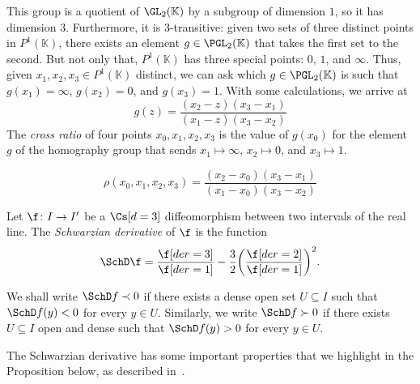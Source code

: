 \documentclass[../main]{subfiles}
\begin{document}
This group is a quotient of \(\GL_2(\mathbb{K})\) by a subgroup of dimension \(1\), so it has dimension \(3\). Furthermore, it is \(3\)-transitive: given two sets of three distinct points in \(P^1(\mathbb{K})\), there exists an element \(g \in \PGL_2(\mathbb{K})\) that takes the first set to the second. But not only that, \(P^1(\mathbb{K})\) has three special points: \(0\), \(1\), and \(\infty\). Thus, given \(x_1,x_2, x_3 \in P^1(\mathbb{K})\) distinct, we can ask which \(g \in \PGL_2(\mathbb{K})\) is such that \(g(x_1) = \infty\), \(g(x_2) = 0\), and \(g(x_3) = 1\). With some calculations, we arrive at
\begin{equation*}
  g(z) = \frac{(x_2 - z)(x_3 - x_1)}{(x_1 - z)(x_3 - x_2)}
\end{equation*}
The \emph{cross ratio} of four points \(x_{0},x_1,x_2,x_3\) is the value of \(g(x_0)\) for the element \(g\) of the homography group that sends \(x_1 \mapsto \infty\), \(x_2 \mapsto 0\), and \(x_3 \mapsto 1\).
\begin{definition}
  \begin{equation*}
    \rho(x_0,x_1,x_2,x_3) = \frac{(x_2 - x_0)(x_3 - x_1)}{(x_1 - x_0)(x_3 - x_2)}
  \end{equation*}
\end{definition}

\begin{definition}
  Let \(\f \colon I \to I'\) be a \(\Cs[d = 3]\) diffeomorphism between two intervals of the real line.
  The \emph{Schwarzian derivative} of \(\f\) is the function
  \begin{equation*}
    \SchD\f = \frac{\f[der = 3]}{\f[der = 1]} - \frac{3}{2}\rpar*{\frac{\f[der = 2]}{\f[der = 1]}}^2.
  \end{equation*}
\end{definition}
We shall write \(\SchD f \prec 0\) if there exists a dense open set \(U \subseteq I\) such that \(\SchD f(y) < 0\) for every \(y \in U\). Similarly, we write \(\SchD f \succ 0\) if there exists \(U \subseteq I\) open and dense such that \(\SchD f(y) > 0\) for every \(y \in U\).

The Schwarzian derivative has some important properties that we highlight in the Proposition below, as described in~\cite[Proposition B.1]{bonifantSchwarzianDerivativesCylinder2008}.
\end{document}
